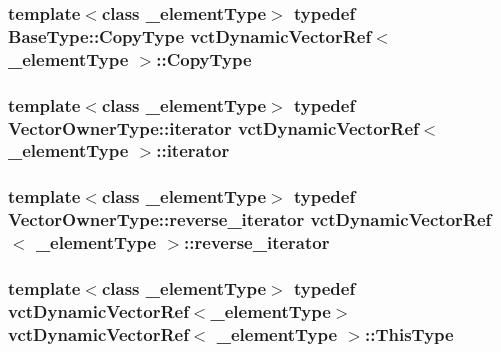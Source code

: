 \hypertarget{classvct_dynamic_vector_ref_a3d9425849772cea79d6ba9136ae2e3fd}{
\subsubsection[{Copy\-Type}]{\setlength{\rightskip}{0pt plus 5cm}template$<$class \-\_\-element\-Type$>$ typedef {\bf Base\-Type\-::\-Copy\-Type} {\bf vct\-Dynamic\-Vector\-Ref}$<$ \-\_\-element\-Type $>$\-::{\bf Copy\-Type}}}\label{classvct_dynamic_vector_ref_a3d9425849772cea79d6ba9136ae2e3fd}
\hypertarget{classvct_dynamic_vector_ref_a60db16bd51d6129d93e63c1df05c544e}{
\subsubsection[{iterator}]{\setlength{\rightskip}{0pt plus 5cm}template$<$class \-\_\-element\-Type$>$ typedef {\bf Vector\-Owner\-Type\-::iterator} {\bf vct\-Dynamic\-Vector\-Ref}$<$ \-\_\-element\-Type $>$\-::{\bf iterator}}}\label{classvct_dynamic_vector_ref_a60db16bd51d6129d93e63c1df05c544e}
\hypertarget{classvct_dynamic_vector_ref_a4fe85ab37aaaa4b4bd16d4258e91d8b8}{
\subsubsection[{reverse\-\_\-iterator}]{\setlength{\rightskip}{0pt plus 5cm}template$<$class \-\_\-element\-Type$>$ typedef {\bf Vector\-Owner\-Type\-::reverse\-\_\-iterator} {\bf vct\-Dynamic\-Vector\-Ref}$<$ \-\_\-element\-Type $>$\-::{\bf reverse\-\_\-iterator}}}\label{classvct_dynamic_vector_ref_a4fe85ab37aaaa4b4bd16d4258e91d8b8}
\hypertarget{classvct_dynamic_vector_ref_adde8a247e72c476120c26cfa15a37c6d}{
\subsubsection[{This\-Type}]{\setlength{\rightskip}{0pt plus 5cm}template$<$class \-\_\-element\-Type$>$ typedef {\bf vct\-Dynamic\-Vector\-Ref}$<$\-\_\-element\-Type$>$ {\bf vct\-Dynamic\-Vector\-Ref}$<$ \-\_\-element\-Type $>$\-::{\bf This\-Type}}}\label{classvct_dynamic_vector_ref_adde8a247e72c476120c26cfa15a37c6d}
